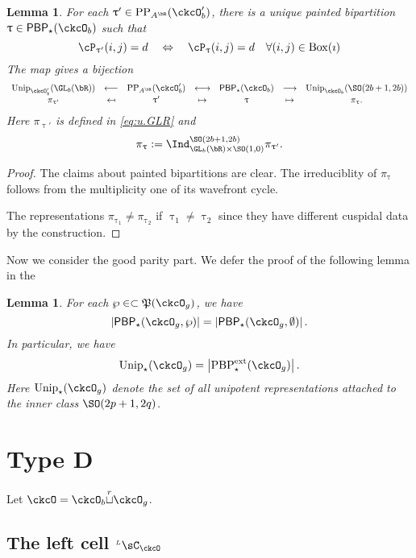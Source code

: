 \documentclass[12pt,a4paper]{amsart}
\def\abs#1{\left|{#1}\right|}
\numberwithin{equation}{section}
\newtheorem{lem}[thm]{Lemma}
\theoremstyle{remark}
\def\Unip{\mathrm{Unip}}
\def\PP{\mathrm{PP}}
\def\BOX#1{\mathrm{Box}(#1)}
\providecommand\mapsfrom{\scalebox{-1}[1]{$\mapsto$}}
\def\LC{{}^{\scriptscriptstyle L}\sC}
\def\cuprow{{\stackrel{r}{\sqcup}}}
\def\CPP{\mathfrak{P}}
\def\PBPes{\mathrm{PBP}^{\mathrm{ext}}_{\star}}
\def\PBP{\mathsf{PBP}}
\begin{document}
\begin{lem}
  For each $\uptau' \in \PP_{A^{\bR}}(\ckcO'_{b})$, there is a unique painted
  bipartition $\uptau\in \PBP_{\star}(\ckcO_{b})$ such that
  \[
    \cP_{\uptau'}(i,j) = d \quad %
    \Leftrightarrow
    \quad
    \cP_{\uptau}(i,j) = d \quad \forall (i,j)\in \BOX{\imath}\\
  \]
  The map gives a bijection
  \[
    \begin{array}{ccccccc}
      \Unip_{\ckcO'_{b}}(\GL_{b}(\bR))&\longleftarrow
      &\PP_{A^{\bR}}(\ckcO'_{b}) & \longleftrightarrow
      & \PBP_{\star}(\ckcO_{b}) & \longrightarrow
      & \Unip_{\ckcO_{b}}(\SO(2b+1,2b))\\
      \pi_{\uptau'} & \mapsfrom & \uptau' & \mapsto
      & \uptau & \mapsto & \pi_{\uptau}.
    \end{array}
  \]
  Here $\pi_{\uptau'}$ is defined in \eqref{eq:u.GLR} and
  \[
    \pi_{\uptau} := \Ind_{\GL_{b}(\bR)\times \SO(1,0)}^{\SO(2b+1,2b)} \pi_{\uptau'}.
  \]
\end{lem}
\begin{proof}
  The claims about painted bipartitions are clear.
  The irreduciblity of $\pi_{\uptau}$ follows from the multiplicity one
  of its wavefront cycle.

  The representations $\pi_{\uptau_{1}}\neq \pi_{\uptau_{2}}$ if
  $\uptau_{1}\neq \uptau_{2}$ since they have different cuspidal data by the
  construction.
\end{proof}

Now we consider the good parity part. We defer the proof of the following lemma
in the 

\begin{lem}
  For each $\wp\in \subset \CPP(\ckcO_{g})$,
  we have
  \[
    \abs{\PBP_{\star}(\ckcO_{g},\wp)} =
    \abs{\PBP_{\star}(\ckcO_{g},\emptyset)}.
  \]
  In particular, we have
  \[
    \Unip_{\star}(\ckcO_{g}) = \abs{\PBPes(\ckcO_{g})}.
  \]
  Here $\Unip_{\star}(\ckcO_{g})$ denote the set of all unipotent
  representations attached to the inner class $\SO(2p+1,2q)$.
\end{lem}


\section{Type D}


Let $\ckcO = \ckcO_{b}\cuprow \ckcO_{g}$.

\subsection{The left cell $\LC_{\ckcO}$}
\end{document}
